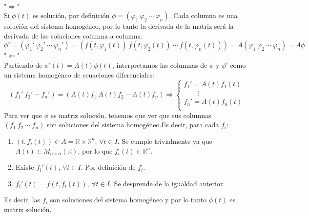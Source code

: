 \documentclass{article}
\makeatletter
\theoremstyle{theorem-style}  %
\theoremstyle{definition-style}
\theoremstyle{example-style}
\renewenvironment{proof}[1][\proofname]{\par
	\pushQED{\qed}%
	\normalfont \topsep6\p@\@plus6\p@\relax
	\list{}{%
		\settowidth{\leftmargin}{\quad:\hskip\labelsep}%
		\setlength{\labelwidth}{0pt}%
		\setlength{\itemindent}{-\leftmargin}%
	}%
	\item[\hskip\labelsep\itshape#1\@addpunct{:}]\ignorespaces
}{%
	\popQED\endlist\@endpefalse
}
\makeatother
\begin{document}
\begin{proof}\ \\
	"$\Rightarrow $"\\
	Si $ \phi(t) $ es solución, por definición $ \phi=(\varphi_1 \ \varphi_2\  \cdots\  \varphi_n) $. Cada columna es una solución del sistema homogéneo, por lo tanto la derivada de la matriz será la derivada de las soluciones columna a columna:
	\[ \phi' = (\varphi_1' \ \varphi_2'\  \cdots\  \varphi_n')=(f(t,\varphi_1(t)) \ f(t,\varphi_2(t))\  \cdots\  f(t,\varphi_n(t)))=A(\varphi_1 \ \varphi_2\  \cdots\  \varphi_n)=A\phi \]
	"$\Leftarrow $"\\
	Partiendo de $ \phi'(t)=A(t)\phi(t) $, interpretamos las columnas de $ \phi $ y $ \phi' $ como un sistema homogéneo de ecuaciones diferenciales:
	\[ (f_1' \ f_2'\  \cdots\  f_n')=(A(t)f_1 \ A(t)f_2\  \cdots\  A(t)f_n)\Rightarrow \begin{cases}
	f_1'=A(t)f_1(t)\\
	\qquad \vdots\\
	f_n'=A(t)f_n(t)\\
	\end{cases} \]
	Para ver que $ \phi $ es matriz solución, tenemos que ver que sus columnas $ (f_1 \ f_2\  \cdots\  f_n) $ son soluciones del sistema homogéneo.Es decir, para cada $ f_i $:
	\begin{enumerate}[\quad i)]
		\item $(t, f_i (t)) \in A=\mathbb{R}\times \mathbb{R}^n$, $\forall t \in I$. Se cumple trivialmente ya que $ A(t)\in M_{n \times n} (\mathbb{R}) $, por lo que $ f_i(t)\in \mathbb{R}^n $.
		\item Existe $ f_i' (t)$, $\forall t \in I$. Por definición de $ f_i $.
		\item $f_i'(t)=f(t, f_i(t))$,  $\forall t \in I$. Se desprende de la igualdad anterior.
	\end{enumerate}
	Es decir, las $ f_i $ son soluciones del sistema homogéneo y por lo tanto $ \phi(t) $ es matriz solución.	
\end{proof}
\end{document}

